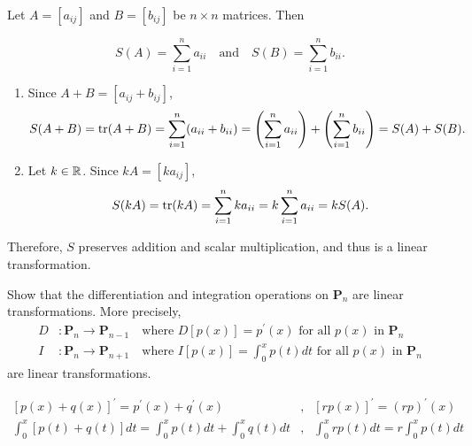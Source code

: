 \documentclass[pdf,9pt]{beamer}
\begin{document}
\begin{frame}[fragile]
\begin{solution}
	Let $A=[a_{ij}]$ and $B=[b_{ij}]$ be $n\times n$ matrices.
	Then

	\[ S(A)=\sum_{i=1}^n a_{ii}\quad\text{and}\quad
	S(B)=\sum_{i=1}^n b_{ii}.\]
    \pause

    \begin{enumerate}
	\item Since $A+B=[ a_{ij}+b_{ij} ]$,
	    \[ S(A+B) = \mbox{tr}(A+B) = \sum_{i=1}^n (a_{ii}+b_{ii})
		=\left(\sum_{i=1}^n a_{ii}\right) + \left(\sum_{i=1}^n b_{ii}\right)
	    =S(A)+S(B).\]
	\pause
	\item Let $k\in\mathbb{R}$. Since $kA=[ ka_{ij} ]$,
	    \[ S(kA) = \mbox{tr}(kA) = \sum_{i=1}^n ka_{ii}
	    =k\sum_{i=1}^n a_{ii} = kS(A).  \]
    \end{enumerate}
    \pause
    Therefore, $S$ preserves addition and scalar multiplication, and thus
    is a linear transformation.
    \myQED
    \end{solution}
\end{frame}
\begin{frame}[fragile]
\begin{problem}
Show that the differentiation and
integration
operations on $\bm{P}_{n}$ are linear transformations. More precisely,
\begin{align*}
  D & : \bm{P}_n \to \bm{P}_{n-1} \quad \mbox{where } D\left[p(x)\right] = p^\prime(x) \mbox{ for all } p(x) \mbox{ in } \bm{P}_n \\
  I & : \bm{P}_n \to \bm{P}_{n+1} \quad \mbox{where } I\left[p(x)\right] = \int_{0}^{x}p(t)dt \mbox{ for all } p(x) \mbox{ in } \bm{P}_n
\end{align*}
are linear transformations.
\end{problem}
\vfill
\pause
\begin{solution}[Sketch]
\begin{align*}
  \left[p(x) + q(x)\right]^\prime = p^\prime(x) + q^\prime(x) &,&\left[rp(x)\right]^\prime = (rp)^\prime(x) \\[1em]
  \int_{0}^{x}\left[p(t) + q(t)\right]dt = \int_{0}^{x}p(t)dt + \int_{0}^{x}q(t)dt &,& \int_{0}^{x}rp(t)dt = r\int_{0}^{x}p(t)dt
\end{align*}
\myQED
\end{solution}
\end{frame}
\end{document}
